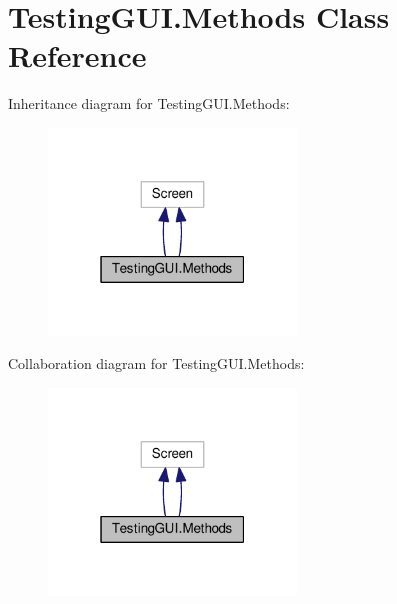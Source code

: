 \hypertarget{classTestingGUI_1_1Methods}{}\section{Testing\+G\+U\+I.\+Methods Class Reference}
\label{classTestingGUI_1_1Methods}


Inheritance diagram for Testing\+G\+U\+I.\+Methods\+:
\nopagebreak
\begin{figure}[H]
\begin{center}
\leavevmode
\includegraphics[width=187pt]{classTestingGUI_1_1Methods__inherit__graph}
\end{center}
\end{figure}


Collaboration diagram for Testing\+G\+U\+I.\+Methods\+:
\nopagebreak
\begin{figure}[H]
\begin{center}
\leavevmode
\includegraphics[width=187pt]{classTestingGUI_1_1Methods__coll__graph}
\end{center}
\end{figure}
